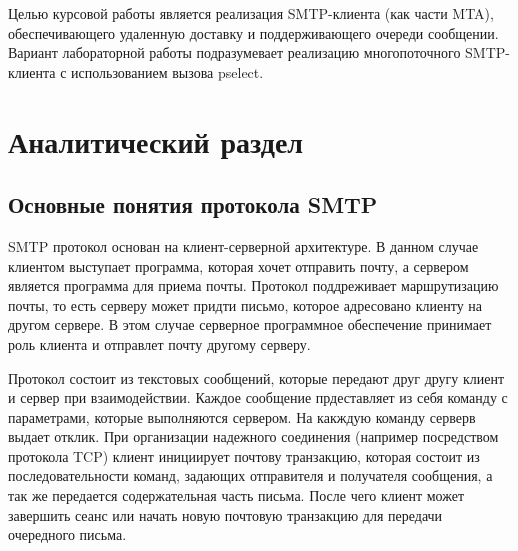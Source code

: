 \documentclass[a4paper,12pt]{report}
\begin{document}
	Целью курсовой работы является реализация SMTP-клиента (как части MTA), обеспечивающего удаленную доставку и поддерживающего очереди сообщении. Вариант лабораторной работы подразумевает реализацию многопоточного SMTP-клиента с использованием вызова pselect.

	\chapter{Аналитический раздел}
	\section{Основные понятия протокола SMTP}

	 SMTP протокол основан на клиент-серверной архитектуре. В данном случае клиентом выступает программа, которая хочет отправить почту, а сервером является программа для приема почты. Протокол поддреживает маршрутизацию почты, то есть серверу может придти письмо, которое адресовано клиенту на другом сервере. В этом случае серверное программное обеспечение принимает роль клиента и отправлет почту другому серверу. 

	 Протокол состоит из текстовых сообщений, которые передают друг другу клиент и сервер при взаимодействии. Каждое сообщение прдеставляет из себя команду с параметрами, которые выполняются сервером. На какждую команду серверв выдает отклик. При организации надежного соединения (например посредством протокола TCP) клиент инициирует почтову транзакцию, которая состоит из последовательности команд, задающих отправителя и получателя сообщения, а так же передается содержательная часть письма. После чего клиент может завершить сеанс или начать новую почтовую транзакцию для передачи очередного письма.
\end{document}
